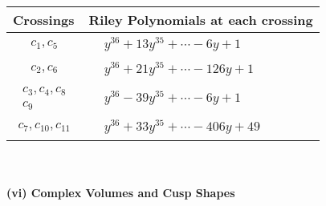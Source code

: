 \documentclass[1p]{elsarticle_modified}
\theoremstyle{definition}
\begin{document}
\begin{tabular}{m{50pt}|m{274pt}}
Crossings & \hspace{64pt}Riley Polynomials at each crossing \\
\hline $$\begin{aligned}c_{1},c_{5}\end{aligned}$$&$\begin{aligned}
&y^{36}+13 y^{35}+\cdots-6 y+1
\end{aligned}$\\
\hline $$\begin{aligned}c_{2},c_{6}\end{aligned}$$&$\begin{aligned}
&y^{36}+21 y^{35}+\cdots-126 y+1
\end{aligned}$\\
\hline $$\begin{aligned}c_{3},c_{4},c_{8}\\c_{9}\end{aligned}$$&$\begin{aligned}
&y^{36}-39 y^{35}+\cdots-6 y+1
\end{aligned}$\\
\hline $$\begin{aligned}c_{7},c_{10},c_{11}\end{aligned}$$&$\begin{aligned}
&y^{36}+33 y^{35}+\cdots-406 y+49
\end{aligned}$\\
\hline
\end{tabular}\\~\\
\newpage\flushleft \textbf{(vi) Complex Volumes and Cusp Shapes}
\end{document}
